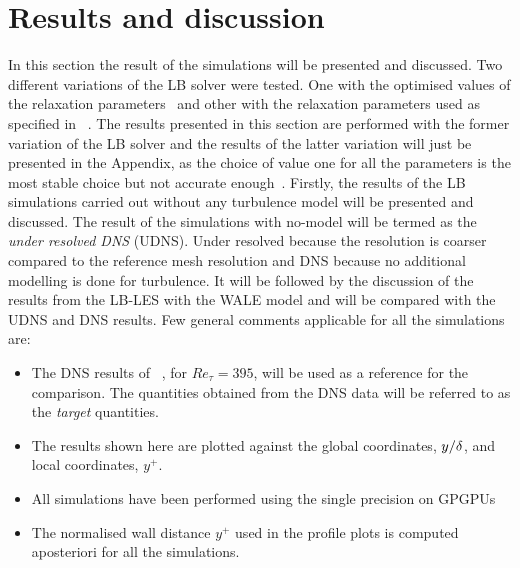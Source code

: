 \newpage

\section{Results and discussion}
In this section the result of the simulations will be presented and discussed. Two different variations of the LB solver were tested. One with the optimised values of the relaxation parameters~\cite{geier:parameter} and other with the relaxation parameters used as specified in ~\cite{geier:cumulant}. The results presented in this section are performed with the former variation of the LB solver  and the results of the latter variation will just be presented in the Appendix, as the choice of value one for all the parameters is the most stable choice but not accurate enough~\cite{geier:parameter}. Firstly, the results of the LB simulations carried out without any turbulence model will be presented and discussed. The result of the simulations with no-model will be termed as the \emph{under resolved DNS} (UDNS). Under resolved because the resolution is coarser compared to the reference mesh resolution and DNS because no additional modelling is done for turbulence. It will be followed by the discussion of the results from the LB-LES with the WALE model and will be compared with the UDNS and DNS results. Few general comments applicable for all the simulations are:

\begin{itemize}
\item The DNS results of~\cite{kim:moin:moser:87} , for $Re_\tau = 395$, will be used as a reference for the comparison. The quantities obtained from the DNS data will be referred to as the \emph{target} quantities.
\item The results shown here are plotted against the global coordinates, $y/\delta$, and local coordinates,  $y^+$.  
\item All simulations have been performed using the single precision on GPGPUs
\item The normalised wall distance $y^+$ used in the profile plots is computed aposteriori for all the simulations.
\end{itemize}

